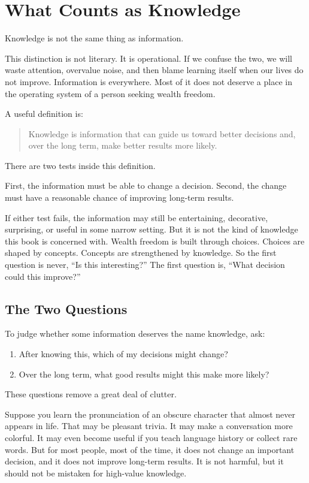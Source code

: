 \chapter{What Counts as Knowledge}

Knowledge is not the same thing as information.

This distinction is not literary. It is operational. If we confuse the two, we will waste attention, overvalue noise, and then blame learning itself when our lives do not improve. Information is everywhere. Most of it does not deserve a place in the operating system of a person seeking wealth freedom.

A useful definition is:

\begin{quote}
Knowledge is information that can guide us toward better decisions and, over the long term, make better results more likely.
\end{quote}

There are two tests inside this definition.

First, the information must be able to change a decision. Second, the change must have a reasonable chance of improving long-term results.

If either test fails, the information may still be entertaining, decorative, surprising, or useful in some narrow setting. But it is not the kind of knowledge this book is concerned with. Wealth freedom is built through choices. Choices are shaped by concepts. Concepts are strengthened by knowledge. So the first question is never, ``Is this interesting?'' The first question is, ``What decision could this improve?''

\section*{The Two Questions}

To judge whether some information deserves the name knowledge, ask:

\begin{enumerate}
\item After knowing this, which of my decisions might change?
\item Over the long term, what good results might this make more likely?
\end{enumerate}

These questions remove a great deal of clutter.

Suppose you learn the pronunciation of an obscure character that almost never appears in life. That may be pleasant trivia. It may make a conversation more colorful. It may even become useful if you teach language history or collect rare words. But for most people, most of the time, it does not change an important decision, and it does not improve long-term results. It is not harmful, but it should not be mistaken for high-value knowledge.

